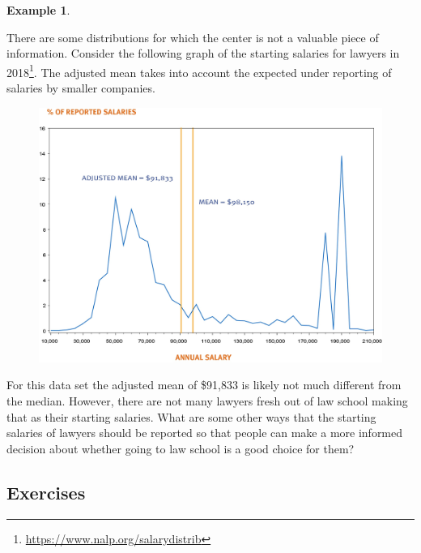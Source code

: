 \documentclass[
]{book}
\theoremstyle{definition}
\theoremstyle{definition}
\newtheorem{example}{Example}[chapter]
\theoremstyle{definition}
\theoremstyle{definition}
\theoremstyle{remark}
\begin{document}
\begin{example}
\protect\hypertarget{exm:unlabeled-div-297}{}\label{exm:unlabeled-div-297}

There are some distributions for which the center is not a valuable piece of information. Consider the following graph of the starting salaries for lawyers in 2018\footnote{\url{https://www.nalp.org/salarydistrib}}. The adjusted mean takes into account the expected under reporting of salaries by smaller companies.

\begin{figure}

{\centering \includegraphics[width=0.7\linewidth]{images/Lawyer_starting_salaries} 

}

\end{figure}

For this data set the adjusted mean of \$91,833 is likely not much different from the median. However, there are not many lawyers fresh out of law school making that as their starting salaries. What are some other ways that the starting salaries of lawyers should be reported so that people can make a more informed decision about whether going to law school is a good choice for them?

\end{example}

\hypertarget{exercises-62}{%
\subsection{Exercises}\label{exercises-62}}
\end{document}

